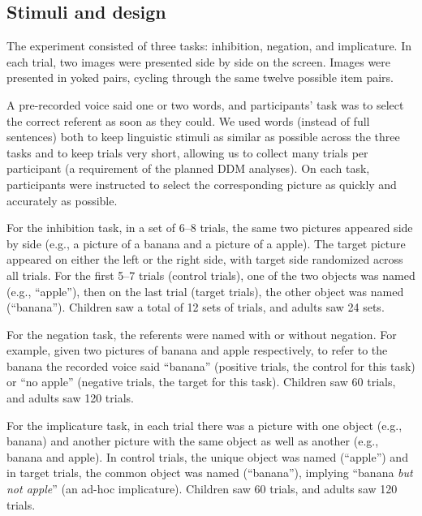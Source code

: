 \documentclass[man, noapacite]{apa2}
\begin{document}
\subsection{Stimuli and design}

The experiment consisted of three tasks: inhibition, negation, and implicature. In each trial, two images were presented side by side on the screen. Images were presented in yoked pairs, cycling through the same twelve possible item pairs. 

A pre-recorded voice said one or two words, and participants' task was to select the correct referent as soon as they could. We used words (instead of full sentences) both to keep linguistic stimuli as similar as possible across the three tasks and to keep trials very short, allowing us to collect many trials per participant (a requirement of the planned DDM analyses). On each task, participants were instructed to select the corresponding picture as quickly and accurately as possible.  

For the inhibition task, in a set of 6--8 trials, the same two pictures appeared side by side (e.g., a picture of a banana and a picture of a apple). The target picture appeared on either the left or the right side, with target side randomized across all trials. For the first 5--7 trials (control trials), one of the two objects was named (e.g., ``apple''), then on the last trial (target trials), the other object was named (``banana'').
Children saw a total of 12 sets of trials, and adults saw 24 sets.

For the negation task, the referents were named with or without negation. For example, given two pictures of banana and apple respectively, to refer to the banana the recorded voice said ``banana'' (positive trials, the control for this task) or ``no apple'' (negative trials, the target for this task). Children saw 60 trials, and adults saw 120 trials.

For the implicature task, in each trial there was a picture with one object (e.g., banana) and another picture with the same object as well as another (e.g., banana and apple). In control trials, the unique object was named (``apple'') and in target trials, the common object was named (``banana''), implying ``banana \emph{but not apple}'' (an ad-hoc implicature). Children saw 60 trials, and adults saw 120 trials.
\end{document}
